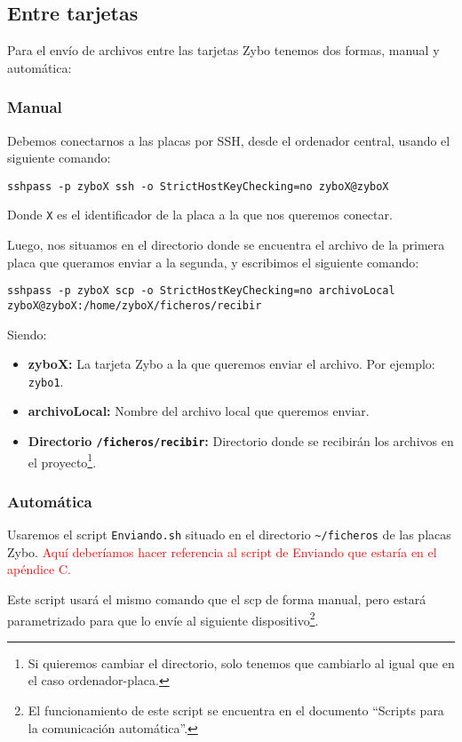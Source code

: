 \newpage
\subsection{Entre tarjetas}
Para el envío de archivos entre las tarjetas Zybo tenemos dos formas, manual y automática:

\subsubsection{Manual}
Debemos conectarnos a las placas por SSH, desde el ordenador central, usando el siguiente comando:
\begin{center}
	\texttt{sshpass -p zyboX ssh -o StrictHostKeyChecking=no zyboX@zyboX}
\end{center}
Donde \texttt{X} es el identificador de la placa a la que nos queremos conectar.

Luego, nos situamos en el directorio donde se encuentra el archivo de la primera placa que queramos enviar a la segunda, y escribimos el siguiente comando:
\begin{center}
	\texttt{sshpass -p zyboX scp -o StrictHostKeyChecking=no archivoLocal zyboX@zyboX:/home/zyboX/ficheros/recibir}
\end{center}
Siendo:
\begin{itemize}
	\item \textbf{zyboX:} La tarjeta Zybo a la que queremos enviar el archivo. Por ejemplo: \texttt{zybo1}.
	\item \textbf{archivoLocal:} Nombre del archivo local que queremos enviar.
	\item \textbf{Directorio \texttt{/ficheros/recibir}:} Directorio donde se recibirán los archivos en el proyecto\footnote{Si quieremos cambiar el directorio, solo tenemos que cambiarlo al igual que en el caso ordenador-placa.}.
\end{itemize}

\subsubsection{Automática}
Usaremos el script \texttt{Enviando.sh} situado en el directorio \texttt{\textasciitilde{}/ficheros} de las placas Zybo.
\textcolor{red}{Aquí deberíamos hacer referencia al script de Enviando que estaría en el  apéndice C.}

Este script usará el mismo comando que el scp de forma manual, pero estará parametrizado para que lo envíe al siguiente dispositivo\footnote{El funcionamiento de este script se encuentra en el documento ``Scripts para la comunicación automática''.}.